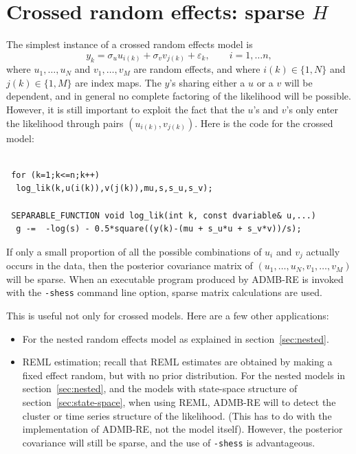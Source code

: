 \documentclass[12pt,letter,reqno]{book}
\begin{document}
\section{Crossed random effects: sparse $H$}
The simplest instance of a crossed random effects model is
\[
  y_{k}= \sigma_u u_{i(k)} + \sigma_v v_{j(k)}+\varepsilon_{k},
            \qquad i=1,\ldots n,
\]
where $u_{1},\ldots,u_{N}$ and $v_{1},\ldots,v_{M}$ are random effects, 
and where $i(k)\in\{1,N\}$  and $j(k)\in\{1,M\}$ are index maps. The 
$y$'s sharing either a $u$ or a $v$ will be dependent, and in general
no complete factoring of the likelihood will be possible. However, it is still
important to exploit the fact that the $u$'s and $v$'s only enter the 
likelihood through pairs $(u_{i(k)},v_{j(k)})$. Here is the code for the
crossed model:
\begin{lstlisting}

 for (k=1;k<=n;k++)
  log_lik(k,u(i(k)),v(j(k)),mu,s,s_u,s_v);

 SEPARABLE_FUNCTION void log_lik(int k, const dvariable& u,...)
  g -=  -log(s) - 0.5*square((y(k)-(mu + s_u*u + s_v*v))/s);

\end{lstlisting}
If only a small proportion of all the possible combinations of $u_i$ and $v_j$ 
actually occurs in the data, then the posterior covariance matrix of
$(u_{1},\ldots,u_{N},v_{1},\ldots,v_{M})$ will be sparse. 
When an executable program produced by ADMB-RE is invoked with the 
\texttt{-shess} command line option, sparse matrix calculations are used. 

This is useful not only for crossed models. Here are a few other applications:
\begin{itemize}
\item For the nested random effects model as explained in section~\ref{sec:nested}.
\item REML estimation; recall that REML estimates are obtained by making
      a fixed effect random, but with no prior distribution. 
      For the nested models in section~\ref{sec:nested},
      and the models with state-space structure of section~\ref{sec:state-space},
      when using REML, ADMB-RE will to detect the cluster or time series structure
      of the likelihood. (This has to do with the implementation of ADMB-RE, not
      the model itself). However, the posterior covariance will still be sparse,
      and the use of \texttt{-shess} is advantageous.
\end{itemize}
\end{document}
